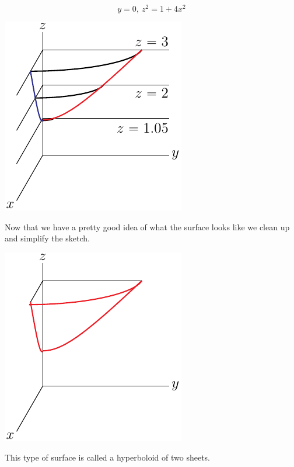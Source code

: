 \begin{eg}[$4x^2+y^2-z^2=-1$]
\begin{equation*}
y=0,\ z^2=1+4x^2
\end{equation*}
\begin{efig}
\begin{center}
   \includegraphics{hyperboloidBaa.pdf}
\end{center}
\end{efig}
Now that we have a pretty good idea of what the surface looks like
we clean up and simplify the sketch.
\begin{efig}
\begin{center}
   \includegraphics{hyperboloidCC.pdf}\qquad\qquad
\end{center}
\end{efig}
This type of surface is called a hyperboloid of two sheets. 
\end{eg}

